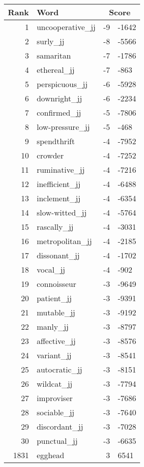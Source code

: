 \begin{longtable}[!htbp]{| rlr@{.}l |}
    \hline
    \textbf{Rank} & \textbf{Word} & \multicolumn{2}{c|}{\textbf{Score}} \\
    \hline
    \endhead
    1 & uncooperative\_jj & -9 & -1642 \\
    2 & surly\_jj & -8 & -5566 \\
    3 & samaritan & -7 & -1786 \\
    4 & ethereal\_jj & -7 & -863 \\
    5 & perspicuous\_jj & -6 & -5928 \\
    6 & downright\_jj & -6 & -2234 \\
    7 & confirmed\_jj & -5 & -7806 \\
    8 & low-pressure\_jj & -5 & -468 \\
    9 & spendthrift & -4 & -7952 \\
    10 & crowder & -4 & -7252 \\
    11 & ruminative\_jj & -4 & -7216 \\
    12 & inefficient\_jj & -4 & -6488 \\
    13 & inclement\_jj & -4 & -6354 \\
    14 & slow-witted\_jj & -4 & -5764 \\
    15 & rascally\_jj & -4 & -3031 \\
    16 & metropolitan\_jj & -4 & -2185 \\
    17 & dissonant\_jj & -4 & -1702 \\
    18 & vocal\_jj & -4 & -902 \\
    19 & connoisseur & -3 & -9649 \\
    20 & patient\_jj & -3 & -9391 \\
    21 & mutable\_jj & -3 & -9192 \\
    22 & manly\_jj & -3 & -8797 \\
    23 & affective\_jj & -3 & -8576 \\
    24 & variant\_jj & -3 & -8541 \\
    25 & autocratic\_jj & -3 & -8151 \\
    26 & wildcat\_jj & -3 & -7794 \\
    27 & improviser & -3 & -7686 \\
    28 & sociable\_jj & -3 & -7640 \\
    29 & discordant\_jj & -3 & -7028 \\
    30 & punctual\_jj & -3 & -6635 \\
    1831 & egghead & 3 & 6541 \\

\end{longtable}

